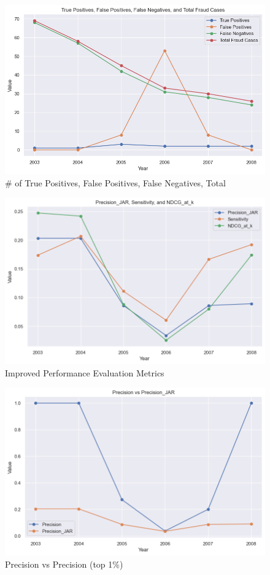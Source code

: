 \documentclass[conference]{IEEEtran}
\begin{document}
		\begin{figure}[H]
	\centerline{\includegraphics[width=\columnwidth]{output2}}
	\caption{\# of True Positives, False Positives, False Negatives, Total}
	\label{fig}
	\end{figure} \vspace{15pt}
			\begin{figure}[H]
	\centerline{\includegraphics[width=\columnwidth]{output3}}
	\caption{Improved Performance Evaluation Metrics}
	\label{fig}
	\end{figure} \vspace{15pt}
				\begin{figure}[H]
	\centerline{\includegraphics[width=\columnwidth]{output4}}
	\caption{Precision vs Precision (top 1\%)}
	\label{fig}
	\end{figure} \vspace{15pt}
\end{document}
